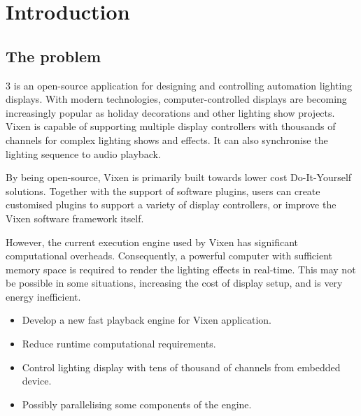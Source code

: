 \chapter{Introduction}
\renewcommand{\baselinestretch}{\mystretch}
\label{chap:Intro}

\section{The problem}

 3 \cite{vixen} is an open-source application for designing and controlling automation lighting displays. With modern technologies, computer-controlled displays are becoming increasingly popular as holiday decorations and other lighting show projects. Vixen is capable of supporting multiple display controllers with thousands of channels for complex lighting shows and effects. It can also synchronise the lighting sequence to audio playback.

By being open-source, Vixen is primarily built towards lower cost Do-It-Yourself solutions. Together with the support of software plugins, users can create customised plugins to support a variety of display controllers, or improve the Vixen software framework itself.

However, the current execution engine used by Vixen has significant computational overheads. Consequently, a powerful computer with sufficient memory space is required to render the lighting effects in real-time. This may not be possible in some situations, increasing the cost of display setup, and is very energy inefficient.

\clearpage



\begin{itemize}[noitemsep]
  \item Develop a new fast playback engine for Vixen application.
  \item Reduce runtime computational requirements.
  \item Control lighting display with tens of thousand of channels from embedded device.
  \item Possibly parallelising some components of the engine.
\end{itemize}


